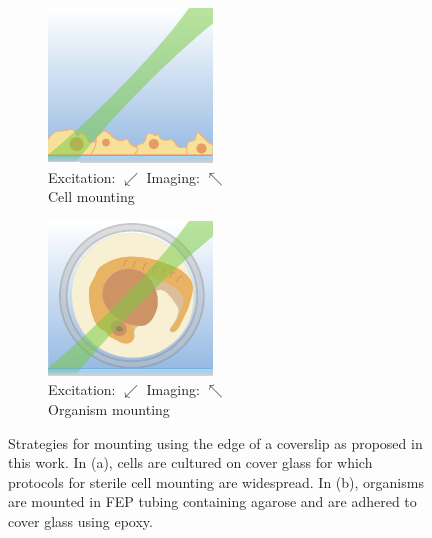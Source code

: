 \begin{figure}
    \centering
    \begin{subfigure}[t]{0.4\linewidth}
         \centering
        \includegraphics{edge_mount/cells}
        \captionsetup{justification=centering}
         \caption{Excitation: \(\swarrow\) \quad Imaging: \(\nwarrow\) \\ Cell mounting}\label{fig:edge_mount/cells}
    \end{subfigure}
    \begin{subfigure}[t]{0.4\linewidth}
             \centering
        \includegraphics{edge_mount/fish}
        \captionsetup{justification=centering}
        \caption{Excitation: \(\swarrow\) \quad Imaging: \(\nwarrow\) \\ Organism mounting}\label{fig:edge_mount/fish}
    \end{subfigure}
    \caption[Strategies for mounting using the edge of a coverslip]{Strategies for mounting using the edge of a coverslip as proposed in this work.
    In (a), cells are cultured on cover glass for which protocols for sterile cell mounting are widespread.
    In (b), organisms are mounted in \gls{FEP} tubing containing agarose and are adhered to cover glass using epoxy.
    }\label{fig:edge_mount}
\end{figure}

